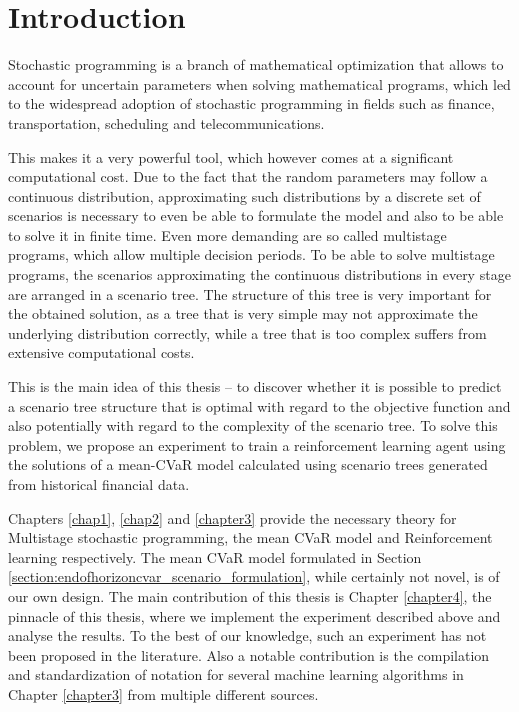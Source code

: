 \chapter*{Introduction}
Stochastic programming is a branch of mathematical optimization that allows to account for uncertain parameters when solving mathematical programs, which led to the widespread adoption of stochastic programming in fields such as finance, transportation, scheduling and telecommunications. 

This makes it a very powerful tool, which however comes at a significant computational cost. Due to the fact that the random parameters may follow a continuous distribution, approximating such distributions by a discrete set of scenarios is necessary to even be able to formulate the model and also to be able to solve it in finite time. Even more demanding are so called multistage programs, which allow multiple decision periods. To be able to solve multistage programs, the scenarios approximating the continuous distributions in every stage are arranged in a scenario tree. The structure of this tree is very important for the obtained solution, as a tree that is very simple may not approximate the underlying distribution correctly, while a tree that is too complex suffers from extensive computational costs. 

This is the main idea of this thesis -- to discover whether it is possible to predict a scenario tree structure that is optimal with regard to the objective function and also potentially with regard to the complexity of the scenario tree. To solve this problem, we propose an experiment to train a reinforcement learning agent using the solutions of a mean-CVaR model calculated using scenario trees generated from historical financial data. 

Chapters \ref{chap1}, \ref{chap2} and \ref{chapter3} provide the necessary theory for Multistage stochastic programming, the mean CVaR model and Reinforcement learning respectively. The mean CVaR model formulated in Section \ref{section:endofhorizoncvar_scenario_formulation}, while certainly not novel, is of our own design.  The main contribution of this thesis is Chapter \ref{chapter4}, the pinnacle of this thesis, where we implement the experiment described above and analyse the results. To the best of our knowledge, such an experiment has not been proposed in the literature. Also a notable contribution is the compilation and standardization of notation for several machine learning algorithms in Chapter \ref{chapter3} from multiple different sources.